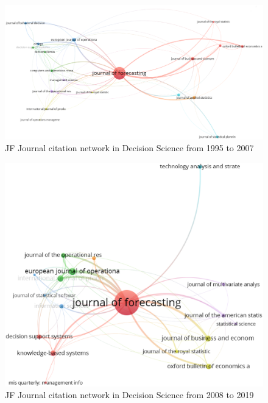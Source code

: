 \documentclass[11pt,a4paper]{elsarticle} %
\begin{document}
\begin{figure}[htbp]
\centering
\includegraphics[scale=0.3]{fig.30.eps}
\caption{JF Journal citation network in Decision Science from 1995 to 2007}
\end{figure}

\begin{figure}[htbp]
\centering
\includegraphics[scale=0.3]{fig.31.eps}
\caption{JF Journal citation network in Decision Science from 2008 to 2019}
\end{figure}
\end{document}
